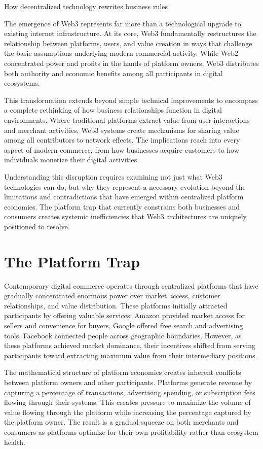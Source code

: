 \documentclass[
  Letterpaper,
]{scrbook}
\begin{document}
How decentralized technology rewrites business rules

The emergence of Web3 represents far more than a technological upgrade
to existing internet infrastructure. At its core, Web3 fundamentally
restructures the relationship between platforms, users, and value
creation in ways that challenge the basic assumptions underlying modern
commercial activity. While Web2 concentrated power and profits in the
hands of platform owners, Web3 distributes both authority and economic
benefits among all participants in digital ecosystems.

This transformation extends beyond simple technical improvements to
encompass a complete rethinking of how business relationships function
in digital environments. Where traditional platforms extract value from
user interactions and merchant activities, Web3 systems create
mechanisms for sharing value among all contributors to network effects.
The implications reach into every aspect of modern commerce, from how
businesses acquire customers to how individuals monetize their digital
activities.

Understanding this disruption requires examining not just what Web3
technologies can do, but why they represent a necessary evolution beyond
the limitations and contradictions that have emerged within centralized
platform economies. The platform trap that currently constrains both
businesses and consumers creates systemic inefficiencies that Web3
architectures are uniquely positioned to resolve.

\section{The Platform Trap}\label{the-platform-trap}

Contemporary digital commerce operates through centralized platforms
that have gradually concentrated enormous power over market access,
customer relationships, and value distribution. These platforms
initially attracted participants by offering valuable services: Amazon
provided market access for sellers and convenience for buyers, Google
offered free search and advertising tools, Facebook connected people
across geographic boundaries. However, as these platforms achieved
market dominance, their incentives shifted from serving participants
toward extracting maximum value from their intermediary positions.

The mathematical structure of platform economics creates inherent
conflicts between platform owners and other participants. Platforms
generate revenue by capturing a percentage of transactions, advertising
spending, or subscription fees flowing through their systems. This
creates pressure to maximize the volume of value flowing through the
platform while increasing the percentage captured by the platform owner.
The result is a gradual squeeze on both merchants and consumers as
platforms optimize for their own profitability rather than ecosystem
health.
\end{document}
